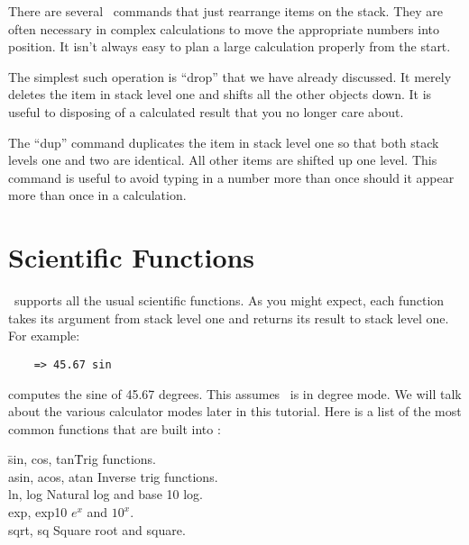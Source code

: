 There are several \CLAC\ commands that just rearrange items on the stack. They are often
necessary in complex calculations to move the appropriate numbers into position. It isn't always
easy to plan a large calculation properly from the start.

The simplest such operation is ``drop'' that we have already discussed. It merely deletes the
item in stack level one and shifts all the other objects down. It is useful to disposing of a
calculated result that you no longer care about.

The ``dup'' command duplicates the item in stack level one so that both stack levels one and two
are identical. All other items are shifted up one level. This command is useful to avoid typing
in a number more than once should it appear more than once in a calculation.


\section{Scientific Functions}

\CLAC\ supports all the usual scientific functions. As you might expect, each function takes its
argument from stack level one and returns its result to stack level one. For example:

\begin{verbatim}
    => 45.67 sin
\end{verbatim}

computes the sine of 45.67 degrees. This assumes \CLAC\ is in degree mode. We will talk about
the various calculator modes later in this tutorial. Here is a list of the most common functions
that are built into \CLAC:

\begin{tabbing}

\hspace*{3em}\=sin, cos, tan\hspace{5em}\=Trig functions.\\
\>             asin, acos, atan\>         Inverse trig functions.\\
\>             ln, log\>                  Natural log and base 10 log.\\
\>             exp, exp10\>               $e^{x}$ and $10^{x}$.\\
\>             sqrt, sq\>                 Square root and square.\\
\end{tabbing}

